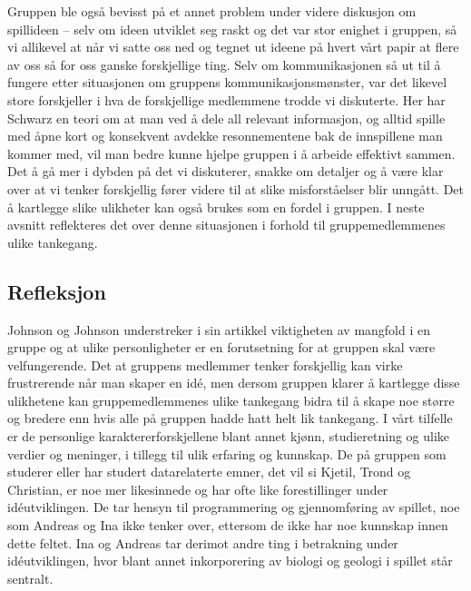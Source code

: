 Gruppen ble også bevisst på et annet problem under videre diskusjon
om spillideen – selv om ideen utviklet seg raskt og det var stor enighet
i gruppen, så vi allikevel at når vi satte oss ned og tegnet ut ideene
på hvert vårt papir at flere av oss så for oss ganske forskjellige ting.
Selv om kommunikasjonen så ut til å fungere etter situasjonen om
gruppens kommunikasjonsmønster, var det likevel store forskjeller i hva
de forskjellige medlemmene trodde vi diskuterte. Her har Schwarz en
teori om at man ved å dele all relevant informasjon, og alltid spille
med åpne kort og konsekvent avdekke resonnementene bak de innspillene
man kommer med, vil man bedre kunne hjelpe gruppen i å arbeide effektivt
sammen. Det å gå mer i dybden på det vi diskuterer, snakke om detaljer
og å være klar over at vi tenker forskjellig fører videre til at slike
misforståelser blir unngått. Det å kartlegge slike ulikheter kan også
brukes som en fordel i gruppen. I neste avsnitt reflekteres det over
denne situasjonen i forhold til gruppemedlemmenes ulike tankegang.

	\subsection{Refleksjon} %
	Johnson og Johnson \cite{Johnson} understreker i sin artikkel viktigheten av mangfold i en gruppe og at ulike personligheter er en forutsetning for at gruppen skal være velfungerende. Det at gruppens medlemmer tenker forskjellig kan virke frustrerende når man skaper en idé, men dersom gruppen klarer å kartlegge disse ulikhetene kan gruppemedlemmenes ulike tankegang bidra til å skape noe større og bredere enn hvis alle på gruppen hadde hatt helt lik tankegang. I vårt tilfelle er de personlige karaktererforskjellene blant annet kjønn, studieretning og ulike verdier og meninger, i tillegg til ulik erfaring og kunnskap. De på gruppen som studerer eller har studert datarelaterte emner, det vil si Kjetil, Trond og Christian, er noe mer likesinnede og har ofte like forestillinger under idéutviklingen. De tar hensyn til programmering og gjennomføring av spillet, noe som Andreas og Ina ikke tenker over, ettersom de ikke har noe kunnskap innen dette feltet. Ina og Andreas tar derimot andre ting i betrakning under idéutviklingen, hvor blant annet inkorporering av biologi og geologi i spillet står sentralt.

